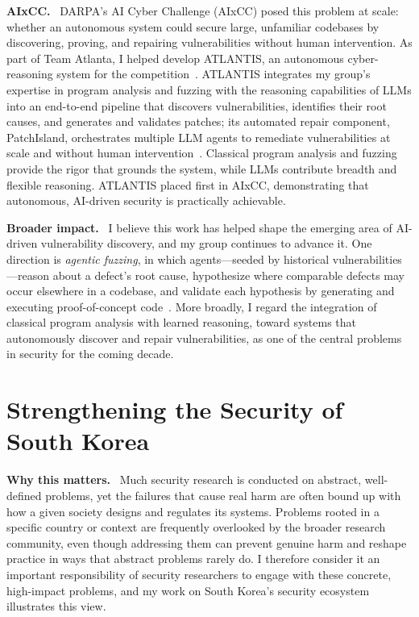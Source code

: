 \documentclass[10pt,letterpaper]{article}
\newcommand{\PP}[1]{\par\smallskip\noindent\textbf{#1.}\ }
\begin{document}
\PP{AIxCC} DARPA's AI Cyber Challenge (AIxCC) posed this problem at scale:
whether an autonomous system could secure large, unfamiliar codebases by
discovering, proving, and repairing vulnerabilities without human intervention.
As part of Team Atlanta, I helped develop ATLANTIS, an autonomous
cyber-reasoning system for the competition~\cite{kim:atlantis}. ATLANTIS
integrates my group's expertise in program analysis and fuzzing with the
reasoning capabilities of LLMs into an end-to-end pipeline that discovers
vulnerabilities, identifies their root causes, and generates and validates
patches; its automated repair component, PatchIsland, orchestrates multiple LLM
agents to remediate vulnerabilities at scale and without human
intervention~\cite{kim:patchisland}. Classical program analysis and fuzzing
provide the rigor that grounds the system, while LLMs contribute breadth and
flexible reasoning. ATLANTIS placed first in AIxCC, demonstrating that
autonomous, AI-driven security is practically achievable.

\PP{Broader impact} I believe this work has helped shape the emerging area of
AI-driven vulnerability discovery, and my group continues to advance it. One
direction is \emph{agentic fuzzing}, in which agents---seeded by historical
vulnerabilities---reason about a defect's root cause, hypothesize where comparable
defects may occur elsewhere in a codebase, and validate each hypothesis by
generating and executing proof-of-concept code~\cite{park:afuzz}. More broadly, I
regard the integration of classical program analysis with learned reasoning,
toward systems that autonomously discover and repair vulnerabilities, as one of
the central problems in security for the coming decade.

\section{Strengthening the Security of South Korea}
\PP{Why this matters} Much security research is conducted on abstract,
well-defined problems, yet the failures that cause real harm are often bound up
with how a given society designs and regulates its systems. Problems rooted in a
specific country or context are frequently overlooked by the broader research
community, even though addressing them can prevent genuine harm and reshape
practice in ways that abstract problems rarely do. I therefore consider it an
important responsibility of security researchers to engage with these concrete,
high-impact problems, and my work on South Korea's security ecosystem illustrates
this view.
\end{document}
